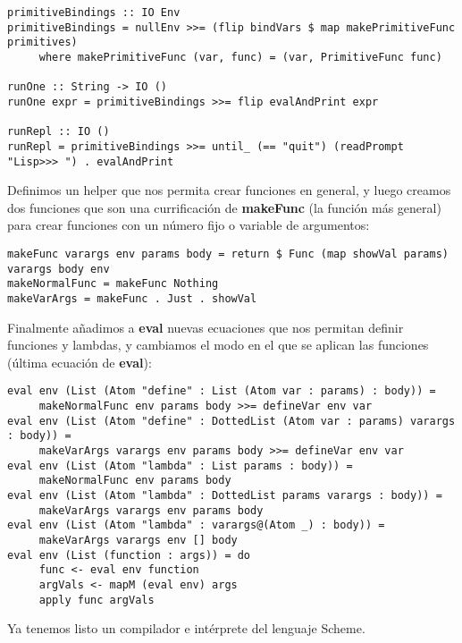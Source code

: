 \begin{minipage}{\linewidth}
\begin{tiny}
\begin{lstlisting}[frame=single]
primitiveBindings :: IO Env
primitiveBindings = nullEnv >>= (flip bindVars $ map makePrimitiveFunc primitives)
     where makePrimitiveFunc (var, func) = (var, PrimitiveFunc func)

runOne :: String -> IO ()
runOne expr = primitiveBindings >>= flip evalAndPrint expr

runRepl :: IO ()
runRepl = primitiveBindings >>= until_ (== "quit") (readPrompt "Lisp>>> ") . evalAndPrint
\end{lstlisting}
\end{tiny}
\end{minipage}

Definimos un helper que nos permita crear funciones en general, y luego creamos dos funciones que son una currificaci\'on de \textbf{makeFunc} (la funci\'on m\'as general) para crear funciones con un n\'umero fijo o variable de argumentos:\\

\begin{minipage}{\linewidth}
\begin{tiny}
\begin{lstlisting}[frame=single]
makeFunc varargs env params body = return $ Func (map showVal params) varargs body env
makeNormalFunc = makeFunc Nothing
makeVarArgs = makeFunc . Just . showVal
\end{lstlisting}
\end{tiny}
\end{minipage}

Finalmente a\~{n}adimos a \textbf{eval} nuevas ecuaciones que nos permitan definir funciones y lambdas, y cambiamos el modo en el que se aplican las funciones (\'ultima ecuaci\'on de \textbf{eval}):\\

\begin{minipage}{\linewidth}
\begin{scriptsize}
\begin{lstlisting}[frame=single]
eval env (List (Atom "define" : List (Atom var : params) : body)) =
     makeNormalFunc env params body >>= defineVar env var
eval env (List (Atom "define" : DottedList (Atom var : params) varargs : body)) =
     makeVarArgs varargs env params body >>= defineVar env var
eval env (List (Atom "lambda" : List params : body)) =
     makeNormalFunc env params body
eval env (List (Atom "lambda" : DottedList params varargs : body)) =
     makeVarArgs varargs env params body
eval env (List (Atom "lambda" : varargs@(Atom _) : body)) =
     makeVarArgs varargs env [] body
eval env (List (function : args)) = do
     func <- eval env function
     argVals <- mapM (eval env) args
     apply func argVals
\end{lstlisting}
\end{scriptsize}
\end{minipage}

Ya tenemos listo un compilador e int\'{e}rprete del lenguaje Scheme.